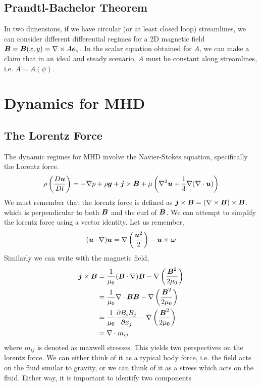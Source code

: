 \documentclass{article}
\begin{document}
\subsection{Prandtl-Bachelor Theorem}
In two dimensions, if we have circular (or at least closed loop) streamlines, we
can consider different differential regimes for a 2D magnetic field $\boldsymbol{B} =
\boldsymbol{B}(x,y) = \nabla\times A\boldsymbol{e}_z$. In the scalar equation obtained for $A$, we can
make a claim that in an ideal and steady scenario, $A$ must be constant along
streamlines, i.e. $A = A(\psi)$. 


\section{Dynamics for MHD}

\subsection{The Lorentz Force}
The dynamic regimes for MHD involve the Navier-Stokes equation, specifically the
Lorentz force. 
\begin{gather*}
    \rho\left(\frac{D \boldsymbol{u}}{D t}\right) = -\nabla p + \rho \boldsymbol{g} + \boldsymbol{j}\times\boldsymbol{B} +
    \mu\left(\nabla^2\boldsymbol{u} + \frac{1}{3}\nabla(\nabla \cdot{\boldsymbol{u}})\right)
\end{gather*}
We must remember that the lorentz force is defined as $\boldsymbol{j}\times\boldsymbol{B} =
(\nabla\times\boldsymbol{B}) \times \boldsymbol{B}$. which is perpendicular to both $\boldsymbol{B}$ and the curl of
$\boldsymbol{B}$. We can attempt to simplify the lorentz force using a vector identity. Let
us remember, 
\begin{gather*}
    (\boldsymbol{u}\cdot\nabla)\boldsymbol{u} = \nabla\left(\frac{\boldsymbol{u}^2}{2}\right) -
    \boldsymbol{u}\times\boldsymbol{\omega}
\end{gather*}
Similarly we can write with the magnetic field, 
\begin{align*}
    \boldsymbol{j} \times \boldsymbol{B} &= \frac{1}{\mu_0}(\boldsymbol{B}\cdot\nabla)\boldsymbol{B} -
    \nabla\left(\frac{\boldsymbol{B}^2}{2\mu_0}\right)\\
    &= \frac{1}{\mu_0}\nabla\cdot\boldsymbol{B}\boldsymbol{B} -\nabla\left(\frac{\boldsymbol{B}^2}{2\mu_0}\right)\\
    &= \frac{1}{\mu_0}\frac{\partial B_iB_j}{\partial x_j} - \nabla\left(\frac{\boldsymbol{B}^2}{2\mu_0}\right)\\
    &= \nabla \cdot m_{ij}
\end{align*}
where $m_{ij}$ is denoted as maxwell stresses. This yields two perspectives on
the lorentz force. We can either think of it as a typical body force, i.e. the
field acts on the fluid similar to gravity, or we can think of it as a stress
which acts on the fluid. Either way, it is important to identify two components
\end{document}
